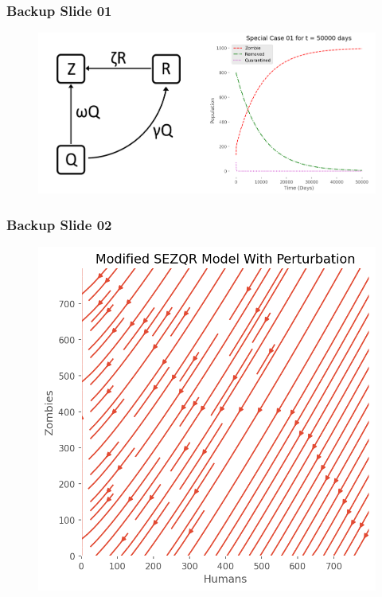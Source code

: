 \documentclass{beamer}
\begin{document}
\begin{frame}
\begin{adjustwidth}{-1.7em}{-1.5em}
\frametitle{Backup Slide 01}

\begin{figure}[H]
\centering
\includegraphics[scale=0.4]{special01.png}
\label{fig:backup01}
\end{figure}
\end{adjustwidth}
\end{frame}



\begin{frame}
\frametitle{Backup Slide 02}

\begin{figure}[H]
\centering
\includegraphics[scale=0.5]{ModifiedSEZQR_PhasePortrait.png}
\label{fig:backup02}
\end{figure}
\end{frame}
\end{document}
